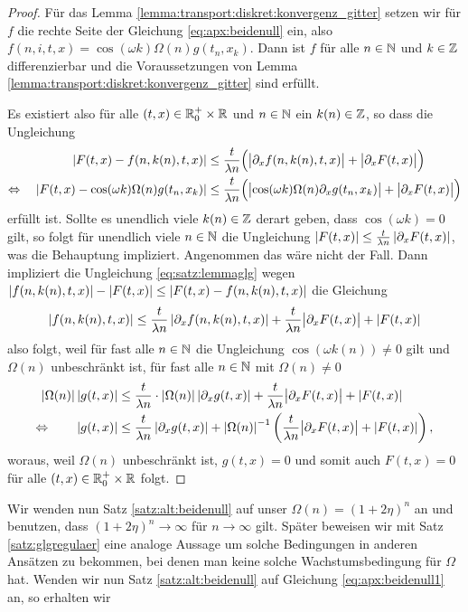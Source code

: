 \begin{proof}
Für das Lemma \ref{lemma:transport:diskret:konvergenz_gitter} setzen wir für $f$ die rechte Seite der Gleichung \eqref{eq:apx:beidenull} ein, also $f(n, i, t, x) = \cos(\omega k) \Omega(n) g(t_n, x_k)$.
Dann ist $f$ für alle $n \in \mathbb N$ und $k \in \mathbb Z$ differenzierbar und die Voraussetzungen von Lemma \ref{lemma:transport:diskret:konvergenz_gitter} sind erfüllt.

Es existiert also für alle $(t,x) \in \mathbb R^+_0 \times \mathbb R$ und $n \in \mathbb N$ ein $k(n) \in \mathbb Z$, so dass die Ungleichung
\begin{align}\label{eq:satz:lemmaglg}
\begin{split}
\left| F(t, x) - f(n, k(n), t, x) \right| &\leq \frac {t}{\lambda n} \Bigl(\bigl\lvert \partial_x f(n, k(n), t, x) \bigr\rvert + \bigl\lvert \partial_x F(t, x) \bigr\rvert \Bigr)\\
\Leftrightarrow \quad \left| F(t, x) - \cos(\omega k) \Omega(n) g(t_n, x_k) \right| &\leq \frac {t}{\lambda n} \Bigl(\bigl\lvert \cos(\omega k) \Omega(n) \partial_x g(t_n, x_k) \bigr\rvert + \bigl\lvert \partial_x F(t, x) \bigr\rvert \Bigr)\\
\end{split}
\end{align}
erfüllt ist. Sollte es unendlich viele $k(n) \in \mathbb Z$ derart geben, dass $\cos(\omega k) = 0$ gilt, so folgt für unendlich viele $n \in \mathbb N$ die Ungleichung $\left| F(t, x) \right| \leq \frac {t}{\lambda n} \left| \partial_x F(t,x) \right|$, was die Behauptung impliziert.
Angenommen das wäre nicht der Fall.
Dann impliziert die Ungleichung \eqref{eq:satz:lemmaglg} wegen $\left| f(n, k(n), t, x) \right| - \left| F(t,x) \right| \leq \left| F(t, x) - f(n, k(n), t, x) \right|$ die Gleichung
\[ \left| f(n, k(n), t, x) \right| \leq \frac {t}{\lambda n} \left| \partial_x f(n, k(n), t, x) \right| +  \frac {t}{\lambda n} \bigl\lvert \partial_x F(t, x) \bigr\rvert + \left| F(t,x) \right| \]
also folgt, weil für fast alle $n \in \mathbb N$ die Ungleichung $\cos(\omega k(n)) \neq 0$ gilt und $\Omega(n)$ unbeschränkt ist, für fast alle $n \in \mathbb N$ mit $\Omega(n) \neq 0$
\begin{align*}
\left| \Omega(n) \right| \left| g(t,x) \right| &\leq \frac{t}{\lambda n} \cdot \left| \Omega(n) \right| \left| \partial_x g(t,x) \right| + \frac {t}{\lambda n} \bigl\lvert \partial_x F(t, x) \bigr\rvert + \left| F(t,x) \right|\\
\Leftrightarrow \qquad \left| g(t,x) \right| &\leq \frac{t}{\lambda n} \left| \partial_x g(t,x) \right| + \left| \Omega(n) \right|^{-1} \left( \frac {t}{\lambda n} \bigl\lvert \partial_x F(t, x) \bigr\rvert + \left| F(t,x) \right| \right),
\end{align*}
woraus, weil $\Omega(n)$ unbeschränkt ist, $g(t,x) = 0$ und somit auch $F(t,x) = 0$ für alle $(t,x) \in \mathbb R^+_0 \times \mathbb R$ folgt.
\end{proof}
Wir wenden nun Satz \ref{satz:alt:beidenull} auf unser $\Omega(n) = (1 + 2\eta)^n$ an und benutzen, dass $(1 + 2 \eta)^n \to \infty$ für $n \to \infty$ gilt.
Später beweisen wir mit Satz \ref{satz:glgregulaer} eine analoge Aussage um solche Bedingungen in anderen Ansätzen zu bekommen, bei denen man keine solche Wachstumsbedingung für $\Omega$ hat.
Wenden wir nun Satz \ref{satz:alt:beidenull} auf Gleichung \eqref{eq:apx:beidenull1} an, so erhalten wir
\\

